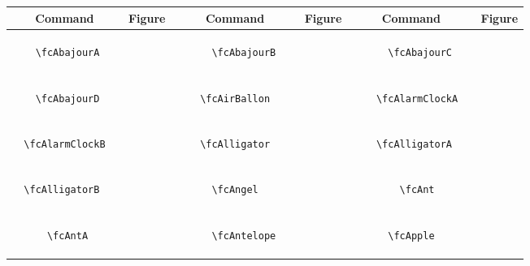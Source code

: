 \documentclass[x11names]{article}
\begin{document}
	
\begin{table}[H]\centering\begin{tabular}{|c|c|c|c|c|c|}\hline{\bf Command} & {\bf Figure} & {\bf Command} & {\bf Figure} & {\bf Command} & {\bf Figure}\\	\hline	&\multirow{5}{*}{	\fcAbajourA	[scale=0.4]} & &\multirow{5}{*}{	\fcAbajourB	[scale=0.4]} & &\multirow{5}{*}{	\fcAbajourC	[scale=0.4]}\\	& & & & & \\	& & & & & \\	\verb|	\fcAbajourA	| & & \verb|	\fcAbajourB	| & & \verb|	\fcAbajourC	| & \\	& & & & & \\	& & & & & \\	& & & & & \\	\hline									
		&\multirow{5}{*}{	\fcAbajourD	[scale=0.4]} & &\multirow{5}{*}{	\fcAirBallon	[scale=0.4]} & &\multirow{5}{*}{	\fcAlarmClockA	[scale=0.4]}\\	& & & & & \\	& & & & & \\	\verb|	\fcAbajourD	| & & \verb|	\fcAirBallon	| & & \verb|	\fcAlarmClockA	| & \\	& & & & & \\	& & & & & \\	& & & & & \\	\hline									
		&\multirow{5}{*}{	\fcAlarmClockB	[scale=0.4]} & &\multirow{5}{*}{	\fcAlligator	[scale=0.8]} & &\multirow{5}{*}{	\fcAlligatorA	[scale=0.4]}\\	& & & & & \\	& & & & & \\	\verb|	\fcAlarmClockB	| & & \verb|	\fcAlligator	| & & \verb|	\fcAlligatorA	| & \\	& & & & & \\	& & & & & \\	& & & & & \\	\hline									
		&\multirow{5}{*}{	\fcAlligatorB	[scale=0.4]} & &\multirow{5}{*}{	\fcAngel	[scale=0.3]} & &\multirow{5}{*}{	\fcAnt	[scale=0.8]}\\	& & & & & \\	& & & & & \\	\verb|	\fcAlligatorB	| & & \verb|	\fcAngel	| & & \verb|	\fcAnt	| & \\	& & & & & \\	& & & & & \\	& & & & & \\	\hline									
		&\multirow{5}{*}{	\fcAntA	[scale=0.4]} & &\multirow{5}{*}{	\fcAntelope	[scale=0.4]} & &\multirow{5}{*}{	\fcApple	[scale=0.8]}\\	& & & & & \\	& & & & & \\	\verb|	\fcAntA	| & & \verb|	\fcAntelope	| & & \verb|	\fcApple	| & \\	& & & & & \\	& & & & & \\	& & & & & \\	\hline									

\end{tabular}
\end{table}
\end{document}
